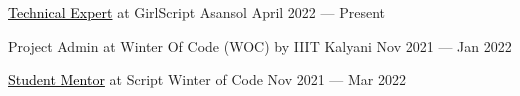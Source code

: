 \href{https://media-exp1.licdn.com/dms/image/C4D2DAQFe_g8MmZZCKA/profile-treasury-image-shrink_1280_1280/0/1650306774998?e=2147483647&v=beta&t=hX0gnDjzG83VSMkTiWUa4FVBo8SGNfmNlMMq7jtOg40}{\textcolor{black}{Technical Expert}} at GirlScript Asansol \hfill April 2022 --- Present

Project Admin at Winter Of Code (WOC) by IIIT Kalyani \hfill Nov 2021 --- Jan 2022

\href{https://media-exp2.licdn.com/dms/image/C4D2DAQEA_6LRDAI8eg/profile-treasury-document-images_800/1/1648468599618?e=1657756800&v=beta&t=hL2_ffWTPAjbkLPQvlRSlOXnvwtfpUXJf3YrcgO-8Ao}{\textcolor{black}{Student Mentor}} at Script Winter of Code \hfill   Nov 2021 --- Mar 2022

